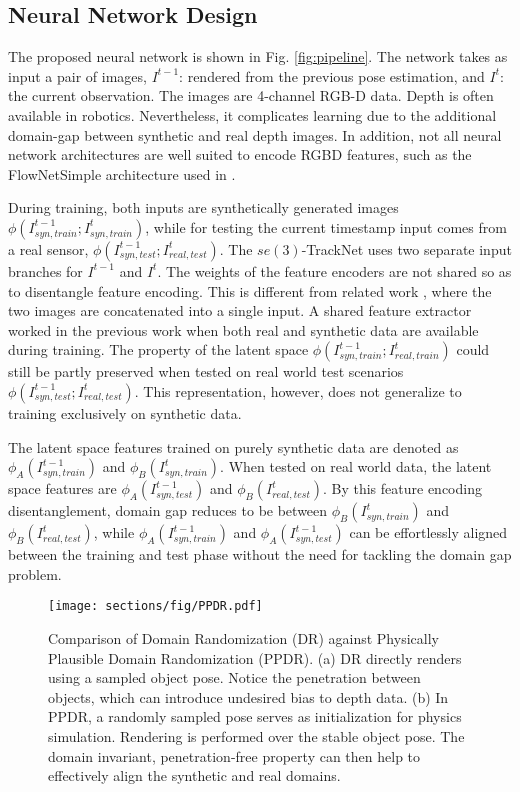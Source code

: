 \documentclass[letterpaper, 10 pt, conference]{ieeeconf}
\begin{document}
\subsection{Neural Network Design}
The proposed neural network is shown in Fig. \ref{fig:pipeline}. The network takes as input a pair of images, $I^{t-1}$: rendered from the previous pose estimation, and $I^{t}$: the current observation. The images are 4-channel RGB-D data. Depth is often available in robotics. Nevertheless, it complicates learning due to the additional domain-gap between synthetic and real depth images. In addition, not all neural network architectures are well suited to encode RGBD features, such as the FlowNetSimple architecture \cite{fischer2015flownet} used in \cite{li2018deepim}.

During training, both inputs are synthetically generated images $\phi(I_{syn,train}^{t-1};I_{syn,train}^{t})$, while for testing the current timestamp input comes from a real sensor, $\phi(I_{syn,test}^{t-1};I_{real,test}^{t})$. The $se(3)$-TrackNet uses two separate input branches for $I^{t-1}$ and $I^{t}$. The weights of the feature encoders are not shared so as to disentangle feature encoding. This is different from related work \cite{li2018deepim}, where the two images are concatenated into a single input. A shared feature extractor worked in the previous work when both real and synthetic data are available during training. The property of the latent space $\phi(I_{syn,train}^{t-1};I_{real,train}^{t})$ could still be partly preserved when tested on real world test scenarios $\phi(I_{syn,test}^{t-1};I_{real,test}^{t})$. This representation, however, does not generalize to training exclusively on synthetic data. 

The latent space features trained on purely synthetic data are denoted as $\phi_A(I_{syn,train}^{t-1})$ and $\phi_B(I_{syn,train}^{t})$. When tested on real world data, the latent space features are $\phi_A(I_{syn,test}^{t-1})$ and $\phi_B(I_{real,test}^{t})$. By this feature encoding disentanglement, domain gap reduces to be between $\phi_B(I_{syn,train}^{t})$ and $\phi_B(I_{real,test}^{t})$, while $\phi_A(I_{syn,train}^{t-1})$ and $\phi_A(I_{syn,test}^{t-1})$ can be effortlessly aligned between the training and test phase without the need for tackling the domain gap problem. 

\begin{figure}[t!]
  \centering
  \texttt{[image: sections/fig/PPDR.pdf]}
  \vspace{-.1in}
  \caption{Comparison of Domain Randomization (DR) against  Physically Plausible Domain Randomization (PPDR). (a) DR directly renders using a sampled object pose. Notice the penetration between objects, which can introduce undesired bias to depth data. (b) In PPDR, a randomly sampled pose serves as initialization for physics simulation. Rendering is performed over the stable object pose. The domain invariant, penetration-free property can then help to effectively align the synthetic and real domains. \vspace{-0.2in}}
  \label{fig:PPDR}
\end{figure}
\end{document}
